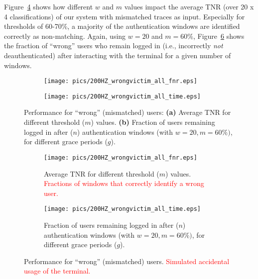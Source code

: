 \documentclass[conference]{IEEEtran}
\newif\ifllncs
\newcommand\changeMika[1]{\textcolor{red}{#1}}
\newcommand\changeMika[1]{{#1}}
\begin{document}
Figure~\ref{fig:wrongvictim_tnr} shows how different $w$ and $m$ values impact the average TNR (over 20 x 4 classifications) of our system with mismatched traces as input. Especially for thresholds of 60-70\%, a majority of the authentication windows are identified correctly as non-matching. Again, using $w=20$ and $m=60\%$, Figure~\ref{fig:wrongvictim_time} shows the fraction of ``wrong'' users who remain logged in (i.e., incorrectly \textit{not} deauthenticated) after interacting with the terminal for a given number of windows. 

\ifllncs

\begin{figure}
\centering
\begin{subfigure}{.5\textwidth}
  \centering
  \texttt{[image: pics/200HZ\_wrongvictim\_all\_fnr.eps]}
\caption{}
  \label{fig:wrongvictim_tnr}
\end{subfigure}\begin{subfigure}{.5\textwidth}
  \centering
  \texttt{[image: pics/200HZ\_wrongvictim\_all\_time.eps]}
\caption{}
  \label{fig:wrongvictim_time}
\end{subfigure}
\caption{Performance for ``wrong'' (mismatched) users: \textbf{(a)} Average TNR for different threshold ($m$) values. \textbf{(b)} Fraction of users remaining logged in after ($n$) authentication windows (with $w=20, m=60\%)$, for different grace periods ($g$).}
\end{figure}

\else

\begin{figure}[t!]
	\centering
	\begin{subfigure}[b]{1\linewidth}
	\centering
		\texttt{[image: pics/200HZ\_wrongvictim\_all\_fnr.eps]}
		\caption{Average TNR for different threshold ($m$) values. \changeMika{Fractions of windows that correctly identify a wrong user.}}
		\label{fig:wrongvictim_tnr}
	\end{subfigure}

	\begin{subfigure}[b]{1\linewidth}
	\centering
		\texttt{[image: pics/200HZ\_wrongvictim\_all\_time.eps]}
		\caption{Fraction of users remaining logged in after ($n$) authentication windows (with $w=20, m=60\%)$, for different grace periods ($g$).}
		\label{fig:wrongvictim_time}
	\end{subfigure}
\caption{Performance for ``wrong'' (mismatched) users. \changeMika{Simulated accidental usage of the terminal.}}
\vskip-0.5cm
\end{figure}
\end{document}
